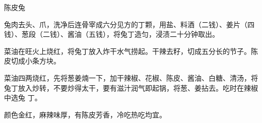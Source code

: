 \begin{recipe}{陈皮兔}

\ingredients


\preparation

\step 兔肉去头、爪，洗净后连骨宰成六分见方的丁颗，用盐、料酒（二钱）、姜片（四
钱）、葱段（二钱）、酱油（五钱），将兔丁造匀，浸渍二十分钟取出。

\step 菜油在旺火上烧红，将兔丁放入炸干水气捞起。干辣去籽，切成五分长的节子。陈
皮切成小条方块。

\step 菜油四两烧红，先将葱姜煵一下，加干辣椒、花椒、陈皮、酱油、白糖、清汤，将
兔丁放入炒转，不要炒得太干，要有滋汁润气即起锅，将葱、姜拈去。吃时在辣椒中选兔
丁。

\features

颜色金红，麻辣味厚，有陈皮芳香，冷吃热吃均宜。

\end{recipe}

